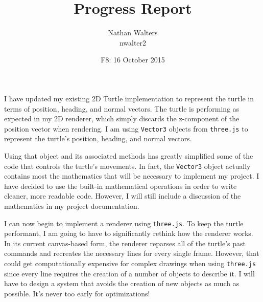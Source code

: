 \documentclass[12pt]{article}
\title{\vspace{-8ex}Progress Report}
\author{Nathan Walters\\nwalter2}
\date{F8: 16 October 2015}
\begin{document}
\maketitle

I have updated my existing 2D Turtle implementation to represent the turtle in terms of position, heading, and normal vectors. The turtle is performing as expected in my 2D renderer, which simply discards the z-component of the position vector when rendering. I am using \texttt{Vector3} objects from \texttt{three.js} to represent the turtle's position, heading, and normal vectors.

Using that object and its associated methods has greatly simplified some of the code that controls the turtle's movements. In fact, the \texttt{Vector3} object actually contains most the mathematics that will be necessary to implement my project. I have decided to use the built-in mathematical operations in order to write cleaner, more readable code. However, I will still include a discussion of the mathematics in my project documentation.

I can now begin to implement a renderer using \texttt{three.js}. To keep the turtle performant, I am going to have to significantly rethink how the renderer works. In its current canvas-based form, the renderer reparses all of the turtle's past commands and recreates the necessary lines for every single frame. However, that could get computationally expensive for complex drawings when using \texttt{three.js} since every line requires the creation of a number of objects to describe it. I will have to design a system that avoids the creation of new objects as much as possible. It's never too early for optimizations!
\end{document}
